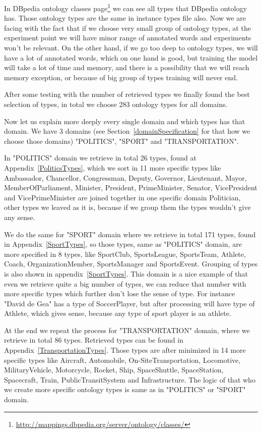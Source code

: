 \documentclass[thesis=M,english]{FITthesis}[2018/05/30]
\begin{document}
	In DBpedia ontology classes page\footnote{\url{http://mappings.dbpedia.org/server/ontology/classes/}} we can see all types that DBpedia ontology has. Those ontology types are the same in instance types file also. Now we are facing with the fact that if we choose very small group of ontology types, at the experiment point we will have minor range of annotated words and experiments won't be relevant. On the other hand, if we go too deep to ontology types, we will have a lot of annotated words, which on one hand is good, but training the model will take a lot of time and memory, and there is a possibility that we will reach memory exception, or because of big group of types training will never end.  

After some testing with the number of retrieved types we finally found the best selection of types, in total we choose 283 ontology types for all domains.

Now let us explain more deeply every single domain and which types has that domain. We have 3 domains (see Section~\ref{domainSpecification} for that how we choose those domains) "POLITICS", "SPORT" and "TRANSPORTATION".

In "POLITICS" domain we retrieve in total 26 types, found at Appendix~\ref{PoliticsTypes}, which we sort in 11 more specific types like Ambassador, Chancellor, Congressman, Deputy, Governor, Lieutenant, Mayor, MemberOfParliament, Minister, President, PrimeMinister, Senator, VicePresident and VicePrimeMinister are joined together in one specific domain Politician, other types we leaved as it is, because if we group them the types wouldn't give any sense.  

	We do the same for "SPORT" domain where we retrieve in total 171 types, found in Appendix~\ref{SportTypes}, so those types, same as "POLITICS" domain, are more specified in 8 types, like SportClub, SportsLeague, SportsTeam, Athlete, Coach, OrganizationMember, SportsManager and SportsEvent. Grouping of types is also shown in appendix~\ref{SportTypes}. This domain is a nice example of that even we retrieve quite a big number of types, we can reduce that number with more specific types which further don't lose the sense of type. For instance "David de Gea" has a type of SoccerPlayer, but after processing will have type of Athlete, which gives sense, because any type of sport player is an athlete.

	At the end we repeat the process for "TRANSPORTATION" domain, where we retrieve in total 86 types. Retrieved types can be found in Appendix~\ref{TransportationTypes}. Those types are after minimized in 14 more specific types like Aircraft, Automobile,  On-SiteTransportation, Locomotive, MilitaryVehicle, Motorcycle, Rocket, Ship, SpaceShuttle, SpaceStation, Spacecraft, Train, PublicTransitSystem and Infrastructure. The logic of that who we create more specific ontology types is same as in "POLITICS" or "SPORT" domain.   
\end{document}
